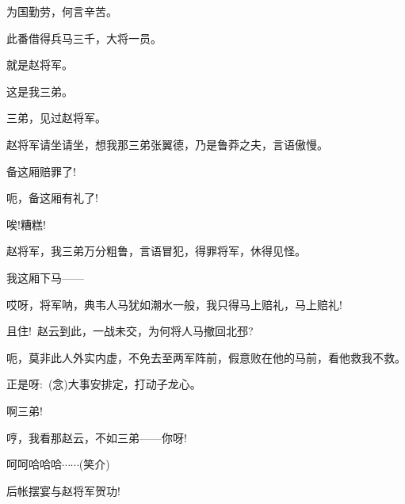 {{为国勤劳，何言辛苦。}

{此番借得兵马三千，大将一员。}

{就是赵将军。}

{这是我三弟。}

{三弟，见过赵将军。}

{赵将军请坐请坐，想我那三弟张翼德，乃是鲁莽之夫，言语傲慢。}

{备这厢赔罪了!}

{呃，备这厢有礼了!}

{\vspace{5pt}}

{唉!糟糕!}

{赵将军，我三弟万分粗鲁，言语冒犯，得罪将军，休得见怪。}

{我这厢下马------}

{哎呀，将军呐，典韦人马犹如潮水一般，我只得马上赔礼，马上赔礼!}

{\vspace{5pt}}

{且住!~赵云到此，一战未交，为何将人马撤回北邳?}

{呃，莫非此人外实内虚，不免去至两军阵前，假意败在他的马前，看他救我不救。}

{正是呀:~({\akai 念})大事安排定，打动子龙心。}

{\vspace{5pt}}

{啊三弟!}

{哼，我看那赵云，不如三弟------你呀!}

{\vspace{5pt}}

{呵呵哈哈哈$\cdots{}\cdots{}$({\hwfs 笑介})}

{后帐摆宴与赵将军贺功!}

}
